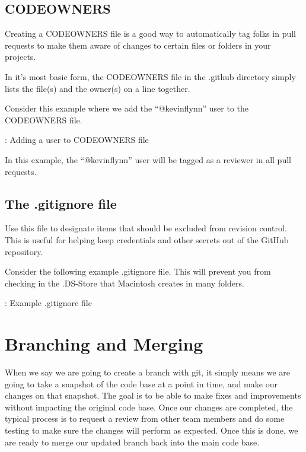\subsection{CODEOWNERS}

\justifying
Creating a CODEOWNERS file is a good way to automatically tag folks in pull requests to make them aware of
changes to certain files or folders in your projects.

\justifying
In it's most basic form, the CODEOWNERS file in the .github directory simply lists the file(s) and the owner(s) on a line together.

\justifying
Consider this example where we add the ``@kevinflynn'' user to the CODEOWNERS file.

\begin{mybox}{\thetcbcounter: Adding a user to CODEOWNERS file}
    
\end{mybox}

\justifying
In this example, the ``@kevinflynn'' user will be tagged as a reviewer in all pull requests.

\subsection{The .gitignore file}

\justifying
Use this file to designate items that should be excluded from revision
control. This is useful for helping keep credentials and other secrets out of the GitHub repository.

\justifying
Consider the following example .gitignore file. This will prevent you from checking in the .DS-Store that
Macintosh creates in many folders.

\begin{mybox}{\thetcbcounter: Example .gitignore file}
    
\end{mybox}

\section{Branching and Merging}

When we say we are going to create a branch with git, it simply means we are going to take a snapshot of the code base at a point in time, and make our changes on that snapshot. The goal is to be able to make fixes and improvements without impacting the original code base.
Once our changes are completed, the typical process is to request a review from other team members and do some testing to make sure the changes will perform as expected. Once this is done, we are ready to merge our updated branch back into the main code base.

